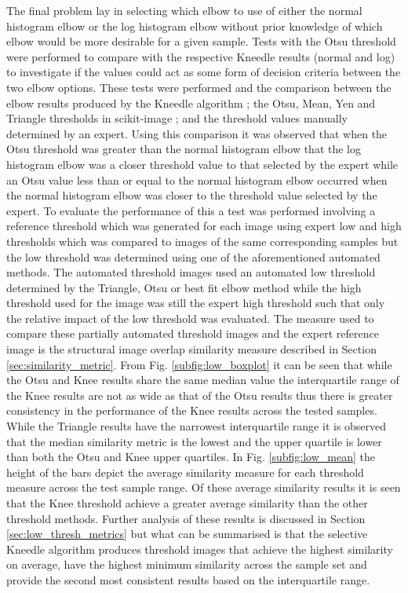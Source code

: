 \par The final problem lay in selecting which elbow to use of either the normal histogram elbow or the log histogram elbow without prior knowledge of which elbow would be more desirable for a given sample. Tests with the Otsu threshold were performed to compare with the respective Kneedle results (normal and log) to investigate if the values could act as some form of decision criteria between the two elbow options. These tests were performed and the comparison between the elbow results produced by the Kneedle algorithm \cite{kneedle_arvai}; the Otsu, Mean, Yen and Triangle thresholds in scikit-image \cite{scikit-image}; and the threshold values manually determined by an expert. Using this comparison it was observed that when the Otsu threshold was greater than the normal histogram elbow that the log histogram elbow was a closer threshold value to that selected by the expert while an Otsu value less than or equal to the normal histogram elbow occurred when the normal histogram elbow was closer to the threshold value selected by the expert. To evaluate the performance of this a test was performed involving a reference threshold which was generated for each image using expert low and high thresholds which was compared to images of the same corresponding samples but the low threshold was determined using one of the aforementioned automated methods. The automated threshold images used an automated low threshold determined by the Triangle, Otsu or best fit elbow method while the high threshold used for the image was still the expert high threshold such that only the relative impact of the low threshold was evaluated. The measure used to compare these partially automated threshold images and the expert reference image is the structural image overlap similarity measure described in Section \ref{sec:similarity_metric}. From Fig. \ref{subfig:low_boxplot} it can be seen that while the Otsu and Knee results share the same median value the interquartile range of the Knee results are not as wide as that of the Otsu results thus there is greater consistency in the performance of the Knee results across the tested samples. While the Triangle results have the narrowest interquartile range it is observed that the median similarity metric is the lowest and the upper quartile is lower than both the Otsu and Knee upper quartiles. In Fig. \ref{subfig:low_mean} the height of the bars depict the average similarity measure for each threshold measure across the test sample range. Of these average similarity results it is seen that the Knee threshold achieve a greater average similarity than the other threshold methods. Further analysis of these results is discussed in Section \ref{sec:low_thresh_metrics} but what can be summarised is that the selective Kneedle algorithm produces threshold images that achieve the highest similarity on average, have the highest minimum similarity across the sample set and provide the second most consistent results based on the interquartile range. %
